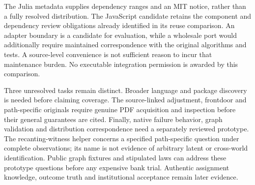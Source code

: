The Julia metadata supplies dependency ranges and an MIT notice, rather than
a fully resolved distribution. The JavaScript candidate retains the component
and dependency review obligations already identified in its reuse comparison.
An adapter boundary is a candidate for evaluation, while a wholesale port
would additionally require maintained correspondence with the original
algorithms and tests. A source-level convenience is not sufficient reason to
incur that maintenance burden. No executable integration permission is awarded
by this comparison.\citep{exec19_otherid_julia,exec19_otherid_dagitty}

Three unresolved tasks remain distinct. Broader language and package discovery
is needed before claiming coverage. The source-linked adjustment, frontdoor
and path-specific originals require genuine PDF acquisition and inspection
before their general guarantees are cited. Finally, native failure behavior,
graph validation and distribution correspondence need a separately reviewed
prototype. The recanting-witness helper concerns a specified path-specific
question under complete observations; its name is not evidence of arbitrary
latent or cross-world identification. Public graph fixtures and stipulated
laws can address these prototype questions before any expensive bank trial.
Authentic assignment knowledge, outcome truth and institutional acceptance
remain later evidence.\citep{exec19_otherid_julia,exec19_otherid_dagitty,exec19_otherid_reference}
